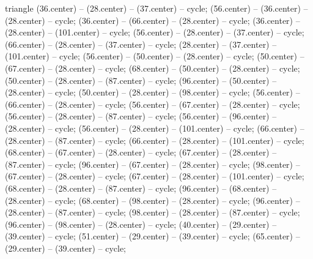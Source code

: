 \begin{pgfonlayer}{triangle}
 (36.center) -- (28.center) -- (37.center) -- cycle; 
 (56.center) -- (36.center) -- (28.center) -- cycle; 
 (36.center) -- (66.center) -- (28.center) -- cycle; 
 (36.center) -- (28.center) -- (101.center) -- cycle; 
 (56.center) -- (28.center) -- (37.center) -- cycle; 
 (66.center) -- (28.center) -- (37.center) -- cycle; 
 (28.center) -- (37.center) -- (101.center) -- cycle; 
 (56.center) -- (50.center) -- (28.center) -- cycle; 
 (50.center) -- (67.center) -- (28.center) -- cycle; 
 (68.center) -- (50.center) -- (28.center) -- cycle; 
 (50.center) -- (28.center) -- (87.center) -- cycle; 
 (96.center) -- (50.center) -- (28.center) -- cycle; 
 (50.center) -- (28.center) -- (98.center) -- cycle; 
 (56.center) -- (66.center) -- (28.center) -- cycle; 
 (56.center) -- (67.center) -- (28.center) -- cycle; 
 (56.center) -- (28.center) -- (87.center) -- cycle; 
 (56.center) -- (96.center) -- (28.center) -- cycle; 
 (56.center) -- (28.center) -- (101.center) -- cycle; 
 (66.center) -- (28.center) -- (87.center) -- cycle; 
 (66.center) -- (28.center) -- (101.center) -- cycle; 
 (68.center) -- (67.center) -- (28.center) -- cycle; 
 (67.center) -- (28.center) -- (87.center) -- cycle; 
 (96.center) -- (67.center) -- (28.center) -- cycle; 
 (98.center) -- (67.center) -- (28.center) -- cycle; 
 (67.center) -- (28.center) -- (101.center) -- cycle; 
 (68.center) -- (28.center) -- (87.center) -- cycle; 
 (96.center) -- (68.center) -- (28.center) -- cycle; 
 (68.center) -- (98.center) -- (28.center) -- cycle; 
 (96.center) -- (28.center) -- (87.center) -- cycle; 
 (98.center) -- (28.center) -- (87.center) -- cycle; 
 (96.center) -- (98.center) -- (28.center) -- cycle; 
 (40.center) -- (29.center) -- (39.center) -- cycle; 
 (51.center) -- (29.center) -- (39.center) -- cycle; 
 (65.center) -- (29.center) -- (39.center) -- cycle; 

\end{pgfonlayer}

